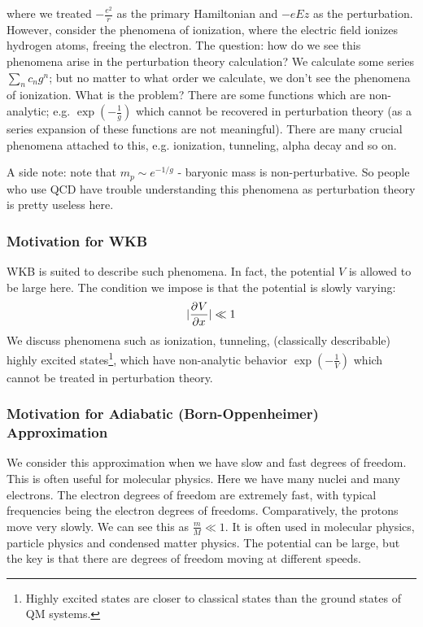 where we treated $-\frac{e^2}{r}$ as the primary Hamiltonian and $-eEz$ as the perturbation. However, consider the phenomena of ionization, where the electric field ionizes hydrogen atoms, freeing the electron. The question: how do we see this phenomena arise in the perturbation theory calculation? We calculate some series $\sum_n c_n g^n$; but no matter to what order we calculate, we don't see the phenomena of ionization. What is the problem? There are some functions which are non-analytic; e.g. $\exp(-\frac{1}{g})$ which cannot be recovered in perturbation theory (as a series expansion of these functions are not meaningful). There are many crucial phenomena attached to this, e.g. ionization, tunneling, alpha decay and so on.

A side note: note that $m_p \sim e^{-1/g}$ - baryonic mass is non-perturbative. So people who use QCD have trouble understanding this phenomena as perturbation theory is pretty useless here.

\subsubsection{Motivation for WKB}
WKB is suited to describe such phenomena. In fact, the potential $V$ is allowed to be large here. The condition we impose is that the potential is slowly varying:
\begin{equation}
    \abs{\dpd{V}{x}} \ll 1
\end{equation}
We discuss phenomena such as ionization, tunneling, (classically describable) highly excited states\footnote{Highly excited states are closer to classical states than the ground states of QM systems.}, which have non-analytic behavior $\exp(-\frac{1}{V})$ which cannot be treated in perturbation theory. 

\subsubsection{Motivation for Adiabatic (Born-Oppenheimer) Approximation}
We consider this approximation when we have slow and fast degrees of freedom. This is often useful for molecular physics. Here we have many nuclei and many electrons. The electron degrees of freedom are extremely fast, with typical frequencies being the electron degrees of freedoms. Comparatively, the protons move very slowly. We can see this as $\frac{m}{M} \ll 1$. It is often used in molecular physics, particle physics and condensed matter physics. The potential can be large, but the key is that there are degrees of freedom moving at different speeds.


